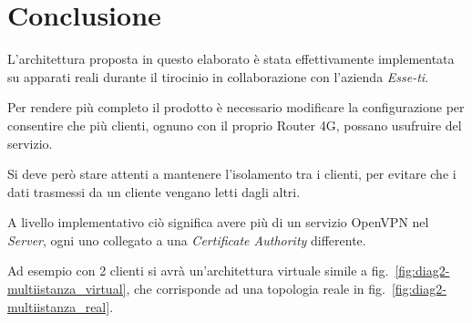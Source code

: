 \chapter{Conclusione \workinprogress}

L'architettura proposta in questo elaborato è stata effettivamente implementata su apparati reali durante il tirocinio in collaborazione con l'azienda \textit{Esse-ti}. 




\todo[da riscrivere]
Per rendere più completo il prodotto è necessario modificare la configurazione per consentire che più clienti, ognuno con il proprio Router 4G, possano usufruire del servizio. 


Si deve però stare attenti a mantenere l'isolamento tra i clienti, per evitare che i dati trasmessi da un cliente vengano letti dagli altri.



A livello implementativo ciò significa avere più di un servizio OpenVPN nel \textit{Server}, ogni uno collegato a una \textit{Certificate Authority} differente.

Ad esempio con 2 clienti si avrà un'architettura virtuale simile a fig.~\ref{fig:diag2-multiistanza_virtual}, che corrisponde ad una topologia reale in fig.~\ref{fig:diag2-multiistanza_real}.

